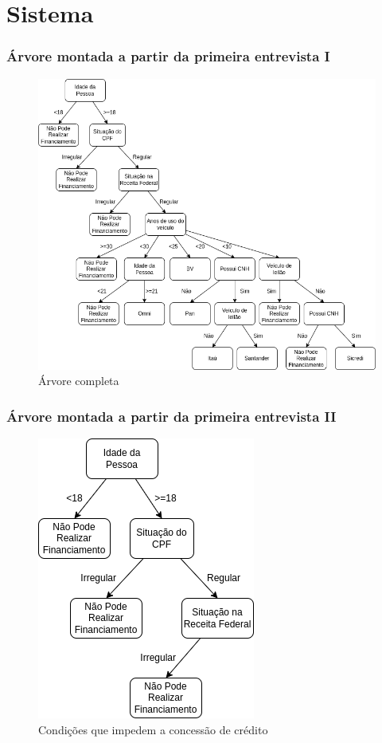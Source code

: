 \documentclass[12pt]{beamer}
\begin{document}
\section{Sistema}
\begin{frame}
    \frametitle{Árvore montada a partir da primeira entrevista I}
    \begin{figure}
        \centering
        \includegraphics[height=.70\textheight]{1.png}
        \caption{Árvore completa}
    \end{figure} 
\end{frame}

\begin{frame}
    \frametitle{Árvore montada a partir da primeira entrevista II}
    \begin{figure}
        \centering
        \includegraphics[height=.70\textheight]{condicoes_nao_aprova.png}
        \caption{Condições que impedem a concessão de crédito}
    \end{figure} 
\end{frame}
\end{document}
